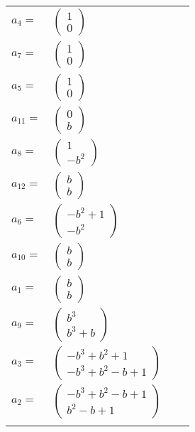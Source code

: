 \documentclass[1p]{elsarticle_modified}
\theoremstyle{definition}
\begin{document}
\begin{tabular}{m{7pt} m{180pt} m{7pt} m{180pt} }
\flushright $a_{4}=$&$\begin{pmatrix}1\\0\end{pmatrix}$ \\
\flushright $a_{7}=$&$\begin{pmatrix}1\\0\end{pmatrix}$ \\
\flushright $a_{5}=$&$\begin{pmatrix}1\\0\end{pmatrix}$ \\
\flushright $a_{11}=$&$\begin{pmatrix}0\\b\end{pmatrix}$ \\
\flushright $a_{8}=$&$\begin{pmatrix}1\\- b^2\end{pmatrix}$ \\
\flushright $a_{12}=$&$\begin{pmatrix}b\\b\end{pmatrix}$ \\
\flushright $a_{6}=$&$\begin{pmatrix}- b^2+1\\- b^2\end{pmatrix}$ \\
\flushright $a_{10}=$&$\begin{pmatrix}b\\b\end{pmatrix}$ \\
\flushright $a_{1}=$&$\begin{pmatrix}b\\b\end{pmatrix}$ \\
\flushright $a_{9}=$&$\begin{pmatrix}b^3\\b^3+b\end{pmatrix}$ \\
\flushright $a_{3}=$&$\begin{pmatrix}- b^3+b^2+1\\- b^3+b^2- b+1\end{pmatrix}$ \\
\flushright $a_{2}=$&$\begin{pmatrix}- b^3+b^2- b+1\\b^2- b+1\end{pmatrix}$\\&\end{tabular}
\end{document}
